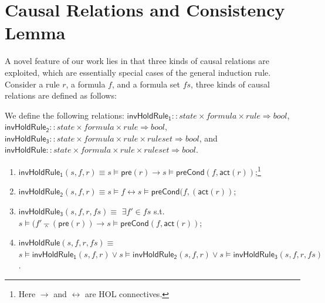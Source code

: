 \documentclass[final]{IEEEtran}
\newlength{\fminilength}
\newenvironment{fmini}[1][\linewidth]
  {\setlength{\fminilength}{#1\fboxsep-2\fboxrule}%
   \vspace{2ex}\noindent\begin{lrbox}{\fminibox}\begin{minipage}{\fminilength}%
   \mbox{ }\hfill\vspace{-2.5ex}}%
  {\end{minipage}\end{lrbox}\vspace{1ex}\hspace{0ex}%
   \framebox{\usebox{\fminibox}}}
\newenvironment{specification}
{\noindent\scriptsize
\tt\begin{fmini}\begin{tabbing}X\=X12345\=XXXX\=XXXX\=XXXX\=XXXX\=XXXX
\=\+\kill} {\end{tabbing}\normalfont\end{fmini}}
\def \andc {\barwedge }
\begin{document}
\section{Causal Relations and Consistency Lemma} \label{sec:causal_rel}

A novel feature of our work lies in that three kinds of causal
relations are exploited, which are essentially special cases of the
general induction rule.  Consider a rule $r$, a formula $f$, and a formula set $fs$, three
 kinds of causal relations are defined as follows:
 \begin{definition}
We define the following relations: $\mathsf{invHoldRule_1}::state \times formula\times rule \Rightarrow bool$, $\mathsf{invHoldRule_2}::state\times  formula\times rule  \Rightarrow bool$,  $\mathsf{invHoldRule_3}::state \times formula\times rule \times rule set\Rightarrow bool$, and $\mathsf{invHoldRule}::state \times formula\times rule \times rule set\Rightarrow bool$.
\vspace{-0.2cm}
\begin{enumerate}
\item $\mathsf{invHoldRule_1} (s,f,r) \equiv $$s \models \mathsf{pre}(r) \longrightarrow s \models \mathsf{preCond}(f ,\mathsf{act}(r))$;\footnote{Here  $\longrightarrow$ and $\longleftrightarrow$ are HOL connectives.  }
\item $\mathsf{invHoldRule_2}(s,f,r) \equiv  $$s \models f \longleftrightarrow s \models \mathsf{preCond}( f,(\mathsf{act}( r))$;
\item $\mathsf{invHoldRule_3}(s,f,r,fs) \equiv$  $\exists f' \in fs$ s.t.
$s \models ( f' \andc (\mathsf{pre}(r))  \longrightarrow s \models \mathsf{preCond}(f ,\mathsf{act}(r))$;
\item $\mathsf{invHoldRule}(s,f,r, fs) \equiv$   $s \models\mathsf{invHoldRule_1}(s,f,r) \vee s\models\mathsf{invHoldRule_2}(s,f,r) \vee s\models \mathsf{invHoldRule_3}(s,f,r,fs)$.
\end{enumerate}
\end{definition}
\vspace{-0.2cm}
\end{document}
